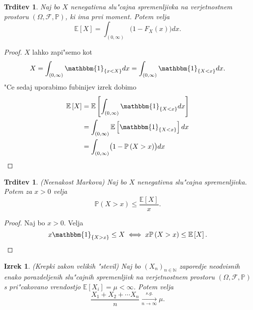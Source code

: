 \documentclass[12pt, a4paper, reqno]{amsart}
\theoremstyle{definition}
\theoremstyle{plain}
\newtheorem{izrek}[definicija]{Izrek}
\newtheorem{trditev}[definicija]{Trditev}
\newcommand{\N}{\mathbb{N}}
\newcommand{\E}{\mathbb{E}}
\newcommand{\Prob}{\mathbb{P}}
\newcommand{\1}{\mathds{1}}
\begin{document}
    \begin{trditev}
        Naj bo $X$ nenegativna slu"cajna spremenljivka na verjetnostnem prostoru $(\Omega, \mathcal{F}, \Prob)$, 
        ki ima prvi moment. Potem velja 
        \begin{equation*}
            \E\left[X\right] = \int_{(0, \infty)}\bigl(1 - F_X(x)\bigr)dx.
        \end{equation*}
        \label{trd:PricakovanaVrednostZPrezivetveno}
    \end{trditev}

    \begin{proof}
        $X$ lahko zapi"semo kot 
        \begin{equation*}
            X = \int_{(0, \infty)}\mathbbm{1}_{\{x < X\}}dx = \int_{(0, \infty)}\mathbbm{1}_{\{X < x\}}dx.
        \end{equation*}
        "Ce sedaj uporabimo fubinijev izrek dobimo
        \begin{align*}
            \E\left[X\right] &= \E\left[\int_{(0, \infty)}\mathbbm{1}_{\{X < x\}}dx\right] \\
                             &= \int_{(0, \infty)}\E\left[\mathbbm{1}_{\{X < x\}}\right]dx \\
                             &= \int_{(0, \infty)}\bigl(1 - \Prob\left(X > x\right)\bigr)dx \\
        \end{align*}
    \end{proof}

    \begin{trditev}(Neenakost Markova)
        \label{trd:neenakostMarkova}
        Naj bo $X$ nenegativna slu"cajna spremenljivka.
        Potem za  $x>0$ velja
        \begin{equation*}
            \Prob\left(X > x\right) \leq \frac{\E\left[X\right]}{x}.
        \end{equation*}
    \end{trditev}

    \begin{proof}
        Naj bo $x > 0$. Velja
        \begin{equation*}
            x\mathbbm{1}_{\{X > x\}} \leq X \iff x\Prob\left(X > x\right) \leq \E\left[X\right].
        \end{equation*}
    \end{proof}

    \begin{izrek}(Krepki zakon velikih "stevil)
        Naj bo $(X_n)_{n\in\N}$ zaporedje neodvisnih enako porazdeljenih
        slu"cajnih spremenljivk na verjetnostnem prostoru $(\Omega, \mathcal{F}, \Prob)$
         s pri"cakovano vrendostjo $\E\left[X_i\right] = \mu <\infty$. Potem velja
        \begin{equation*}
            \frac{X_1 + X_2 + \cdots X_n}{n}\xrightarrow[n\to\infty]{s.g.} \mu.
        \end{equation*}
        \label{izr:KrepkiZakonVelikihStevil}
    \end{izrek}
\end{document}
